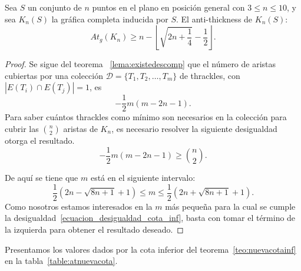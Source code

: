   \begin{theorem}\label{teo:nuevacotainf}
    Sea $S$ un conjunto de $n$ puntos en el plano en posición general con $3\leq n \leq 10$, y sea $K_n(S)$ la gráfica completa inducida por $S$. El anti-thickness de $K_n(S)$:
    \begin{equation}
      At_g(K_n) \geq n - \left\lfloor\sqrt{2n+\frac{1}{4}} - \frac{1}{2}\right\rfloor.
      \label{ecuacion_cota_inf}
    \end{equation}
  \end{theorem}
  \begin{proof}
    Se sigue del teorema ~\ref{lema:existedescomp} que el número de aristas
    cubiertas por una colección $\mathcal{D}=\{T_1,T_2,\dots,T_m\}$ de thrackles,
    con $|E(T_i)\cap E(T_j)| = 1$, es
    \[ -\frac{1}{2}m(m-2n-1). \]
    Para saber cuántos thrackles como mínimo son necesarios en la colección para
    cubrir las $\binom{n}{2}$ aristas de $K_n$, es necesario resolver la
    siguiente desigualdad otorga el resultado.
    \begin{equation}
       -\frac{1}{2}m(m-2n-1) \geq \binom{n}{2}.
       \label{ecuacion_desigualdad_cota_inf}
    \end{equation}

    De aquí se tiene que $m$ está en el siguiente intervalo:
    \[
      \frac{1}{2}\left(2n-\sqrt{8n+1} + 1\right) \leq m \leq  \frac{1}{2}\left(2n+\sqrt{8n+1} + 1\right).
    \]
    Como nosotros estamos interesados en la $m$ más pequeña para la cual se cumple la desigualdad~\ref{ecuacion_desigualdad_cota_inf}, basta con tomar el término de la izquierda para obtener el resultado deseado.
  \end{proof}
    Presentamos los valores dados por la cota inferior del
    teorema~\ref{teo:nuevacotainf} en la tabla~\ref{table:atnuevacota}.

